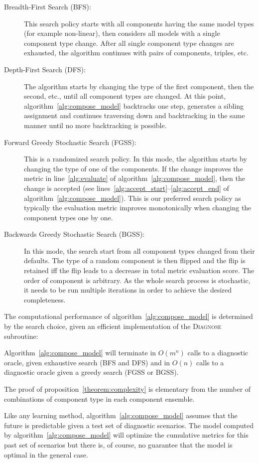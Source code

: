 \begin{description}
%
\item[Breadth-First Search (BFS):]
{
%
This search policy starts with all components having the same model
types (for example non-linear), then considers all models with a
single component type change. After all single component type changes
are exhausted, the algorithm continues with pairs of components,
triples, etc.
%
}
\item[Depth-First Search (DFS):]
{
%
The algorithm starts by changing the type of the first component, then
the second, etc., until all component types are changed. At this
point, algorithm~\ref{alg:compose_model} backtracks one step,
generates a sibling assignment and continues traversing down and
backtracking in the same manner until no more backtracking is
possible.
%
}
\item[Forward Greedy Stochastic Search (FGSS):]
{
%
This is a randomized search policy. In this mode, the algorithm starts
by changing the type of one of the components. If the change improves
the metric in line~\ref{alg:evaluate} of
algorithm~\ref{alg:compose_model}, then the change is accepted (see
lines~\ref{alg:accept_start}--\ref{alg:accept_end} of
algorithm~\ref{alg:compose_model}). This is our preferred search
policy as typically the evaluation metric improves monotonically when
changing the component types one by one.
%
}
\item[Backwards Greedy Stochastic Search (BGSS):]
{
%
In this mode, the search start from all component types changed from
their defaults. The type of a random component is then flipped and the
flip is retained iff the flip leads to a decrease in total metric
evaluation score. The order of component is arbitrary. As the whole
search process is stochastic, it needs to be run multiple iterations
in order to achieve the desired completeness.
%
}
%
\end{description}
\par
The computational performance of algorithm~\ref{alg:compose_model} is
determined by the search choice, given an efficient implementation of
the \textsc{Diagnose} subroutine:
%
\begin{proposition}\label{theorem:complexity}
%
Algorithm~\ref{alg:compose_model} will terminate in $O(m^n)$ calls to
a diagnostic oracle, given exhaustive search (BFS and DFS) and in
$O(n)$ calls to a diagnostic oracle given a greedy search (FGSS or
BGSS).
%
\end{proposition}
%
The proof of proposition~\ref{theorem:complexity} is elementary from
the number of combinations of component type in each component
ensemble.
\par
Like any learning method, algorithm~\ref{alg:compose_model} assumes
that the future is predictable given a test set of diagnostic
scenarios. The model computed by algorithm~\ref{alg:compose_model}
will optimize the cumulative metrics for this past set of scenarios
but there is, of course, no guarantee that the model is optimal in the
general case.
